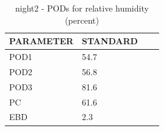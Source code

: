 \begin{table}[p!]
\begin{center}
\begin{tabular}{|l|l|l|l|}
\hline
\multicolumn{1}{|c|}{\cellcolor[HTML]{C0C0C0}\textbf{PARAMETER}} & \multicolumn{1}{c|}{\cellcolor[HTML]{C0C0C0}\textbf{STANDARD}} \\
\hline
\cellcolor[HTML]{C0C0C0}POD1  & 54.7                                \\
\cellcolor[HTML]{C0C0C0}POD2  & 56.8                                \\
\cellcolor[HTML]{C0C0C0}POD3  & 81.6                                \\
\cellcolor[HTML]{C0C0C0}PC    & 61.6                                  \\
\cellcolor[HTML]{C0C0C0}EBD   & 2.3                                 \\
\hline
\end{tabular}
\caption{night2 - PODs for relative humidity (percent)}
\label{tab:podrh:night2}
\end{center}
\end{table}
